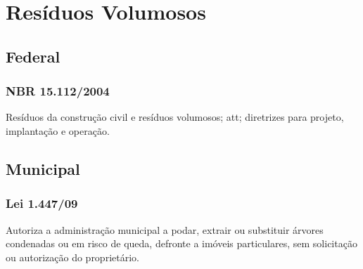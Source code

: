 \section{Resíduos Volumosos}
\begin{subapend}
	\subsection{Federal}
	\begin{subsubapend}
		\item \subsubsection{NBR 15.112/2004}
		Resíduos da construção civil e resíduos volumosos; \gls{att}; diretrizes para projeto, implantação e operação.
	\end{subsubapend}
\end{subapend}

\begin{subapend}
	\subsection{Municipal}
	\begin{subsubapend}
		\item \subsubsection{Lei 1.447/09}
		Autoriza a administração municipal a podar, extrair ou substituir árvores condenadas ou em risco de queda, defronte a imóveis particulares, sem solicitação ou autorização do proprietário.
	\end{subsubapend}
\end{subapend}



